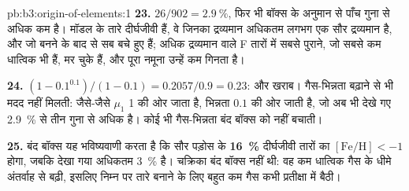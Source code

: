 \begin{solution}{pb:b3:origin-of-elements:1}
\textbf{23.} $26/902 = \qty{2.9}{\percent}$, फिर भी बॉक्स के अनुमान से
पाँच गुना से अधिक कम है। मॉडल के तारे दीर्घजीवी हैं, वे जिनका द्रव्यमान
अधिकतम लगभग एक सौर द्रव्यमान है, और जो बनने के बाद से सब बचे हुए हैं;
अधिक द्रव्यमान वाले F तारों में सबसे पुराने, जो सबसे कम धात्विक भी हैं,
मर चुके हैं, और पूरा नमूना उन्हें कम गिनता है।

\textbf{24.} $(1 - 0.1^{0.1})/(1 - 0.1) = 0.2057/0.9 = \num{0.23}$: और खराब।
गैस-भिन्नता बढ़ाने से भी मदद नहीं मिलती: जैसे-जैसे $\mu_1$ 1 की ओर जाता है,
भिन्नता $0.1$ की ओर जाती है, जो अब भी देखे गए \qty{2.9}{\percent} से तीन गुना
से अधिक है। कोई भी गैस-भिन्नता बंद बॉक्स को नहीं बचाती।

\textbf{25.} बंद बॉक्स यह भविष्यवाणी करता है कि सौर पड़ोस के
\textbf{\qty[text-series-to-math=true]{16}{\percent}} दीर्घजीवी तारों का
$[\mathrm{Fe/H}] < -1$ होगा, जबकि देखा गया अधिकतम \qty{3}{\percent} है।
चक्रिका बंद बॉक्स नहीं थी: वह कम धात्विक गैस के धीमे अंतर्वाह से
बढ़ी, इसलिए निम्न  पर तारे बनाने के लिए बहुत कम गैस कभी
प्रतीक्षा में बैठी।
\end{solution}
